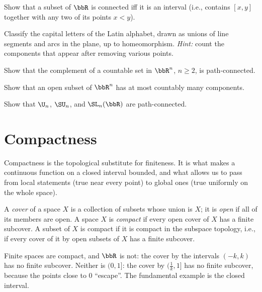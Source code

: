 \begin{xca}\label{xca connected subsets of R}
    Show that a subset of $\bbR$ is connected iff it is an interval (i.e., contains $[x,y]$ together with any two of its points $x<y$).
\end{xca}
\begin{xca}
    Classify the capital letters of the Latin alphabet, drawn as unions of line segments and arcs in the plane, up to homeomorphism. \emph{Hint:} count the components that appear after removing various points.
\end{xca}
\begin{xca}
    Show that the complement of a countable set in $\bbR^n$, $n\geq2$, is path-connected.
\end{xca}
\begin{xca}
    Show that an open subset of $\bbR^n$ has at most countably many components.
\end{xca}
\begin{xca}
    Show that $\U_n$, $\SU_n$, and $\SL_n(\bbR)$ are path-connected.
\end{xca}


\section{Compactness}\label{sec: compactness}

Compactness is the topological substitute for finiteness. It is what makes a continuous function on a closed interval bounded, and what allows us to pass from local statements (true near every point) to global ones (true uniformly on the whole space).

\begin{defn}[Compactness]
    A \emph{cover} of a space $X$ is a collection of subsets whose union is $X$; it is \emph{open} if all of its members are open. A space $X$ is \emph{compact} if every open cover of $X$ has a finite subcover. A subset of $X$ is compact if it is compact in the subspace topology, i.e., if every cover of it by open subsets of $X$ has a finite subcover.
\end{defn}

Finite spaces are compact, and $\bbR$ is not: the cover by the intervals $(-k,k)$ has no finite subcover. Neither is $(0,1]$: the cover by $(\frac1k,1]$ has no finite subcover, because the points close to $0$ ``escape''. The fundamental example is the closed interval.

